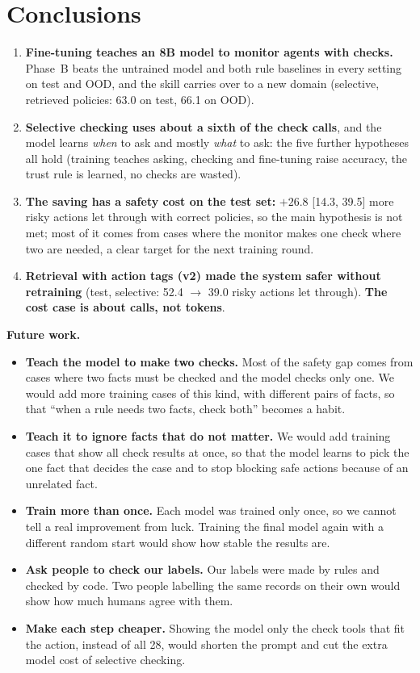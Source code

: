 \documentclass[10pt]{article}
\newcommand{\ci}[2]{[#1, #2]}
\begin{document}
\section{Conclusions}
\begin{enumerate}
\item \textbf{Fine-tuning teaches an 8B model to monitor agents with checks.} Phase~B beats the untrained
  model and both rule baselines in every setting on test and OOD, and the skill carries over to a new domain
  (selective, retrieved policies: 63.0 on test, 66.1 on OOD).
\item \textbf{Selective checking uses about a sixth of the check calls}, and the model learns \emph{when} to
  ask and mostly \emph{what} to ask: the five further hypotheses all hold (training teaches asking, checking
  and fine-tuning raise accuracy, the trust rule is learned, no checks are wasted).
\item \textbf{The saving has a safety cost on the test set:} $+26.8$ \ci{14.3}{39.5} more risky actions let
  through with correct policies, so the main hypothesis is not met; most of it comes from cases where the
  monitor makes one check where two are needed, a clear target for the next training round.
\item \textbf{Retrieval with action tags (v2) made the system safer without retraining} (test, selective:
  52.4 $\rightarrow$ 39.0 risky actions let through). \textbf{The cost case is about calls, not tokens}.
\end{enumerate}
\textbf{Future work.}
\begin{itemize}
\item \textbf{Teach the model to make two checks.} Most of the safety gap comes from cases where two facts
  must be checked and the model checks only one. We would add more training cases of this kind, with
  different pairs of facts, so that ``when a rule needs two facts, check both'' becomes a habit.
\item \textbf{Teach it to ignore facts that do not matter.} We would add training cases that show all check
  results at once, so that the model learns to pick the one fact that decides the case and to stop blocking
  safe actions because of an unrelated fact.
\item \textbf{Train more than once.} Each model was trained only once, so we cannot tell a real improvement
  from luck. Training the final model again with a different random start would show how stable the results are.
\item \textbf{Ask people to check our labels.} Our labels were made by rules and checked by code. Two people
  labelling the same records on their own would show how much humans agree with them.
\item \textbf{Make each step cheaper.} Showing the model only the check tools that fit the action, instead of
  all 28, would shorten the prompt and cut the extra model cost of selective checking.
\end{itemize}

{\footnotesize

}
\end{document}
